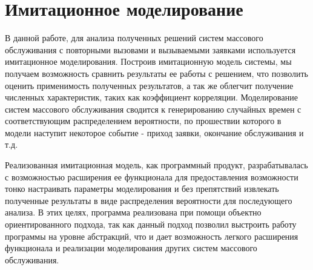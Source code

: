 \section{Имитационное моделирование}
В данной работе, для анализа полученных решений систем массового обслуживания с повторными вызовами и вызываемыми заявками используется имитационное моделирования. Построив имитационную модель системы, мы получаем возможность сравнить результаты ее работы с решением, что позволить оценить применимость полученных результатов, а так же облегчит получение численных характеристик, таких как коэффициент корреляции.
Моделирование систем массового обслуживания сводится к генерированию случайных времен с соответствующим распределением вероятности, по прошествии которого в модели наступит некоторое событие - приход заявки, окончание обслуживания и т.д.%

Реализованная имитационная модель, как программный продукт, разрабатывалась с возможностью расширения ее функционала для предоставления возможности тонко настраивать параметры моделирования и без препятствий извлекать полученные результаты в виде распределения вероятности для последующего анализа. В этих целях, программа реализована при помощи объектно ориентированного подхода, так как данный подход позволил выстроить работу программы на уровне абстракций, что и дает возможность легкого расширения функционала и реализации моделирования других систем массового обслуживания.

